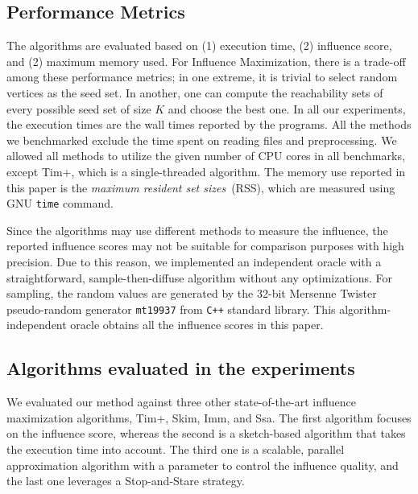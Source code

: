 \subsection{Performance Metrics}

The algorithms are evaluated based on (1) execution time, (2) influence score, and (2) maximum memory used. For Influence Maximization, there is a trade-off among these performance metrics; in one extreme, it is trivial to select random vertices as the seed set. In another, one can compute the reachability sets of every possible seed set of size $K$ and choose the best one. 
In all our experiments, the execution times are the wall times reported by the programs. All the methods we benchmarked exclude the time spent on reading files and preprocessing. %
We allowed all methods to utilize the given number of CPU cores in all benchmarks, except {\sc Tim+}, which is a single-threaded algorithm. The memory use reported in this paper is the {\em maximum resident set sizes}~(RSS), which are measured using GNU {\tt time} command.

Since the algorithms may use different methods to measure the influence, the reported influence scores may not be suitable for comparison purposes with high precision. Due to this reason, we implemented an independent oracle with a straightforward, sample-then-diffuse algorithm without any optimizations. For sampling, the random values are generated by the 32-bit Mersenne Twister pseudo-random generator {\tt mt19937} from {\tt C++} standard library. This algorithm-independent oracle obtains all the influence scores in this paper.

\subsection{Algorithms evaluated in the experiments}

We evaluated our method against three other state-of-the-art influence maximization algorithms, {\sc Tim+}, {\sc Skim}, {\sc Imm}, and {\sc Ssa}. The first algorithm focuses on the influence score, whereas the second is a sketch-based algorithm that takes the execution time into account. The third one is a scalable, parallel approximation algorithm with a parameter to control the influence quality, and the last one leverages a Stop-and-Stare strategy.

